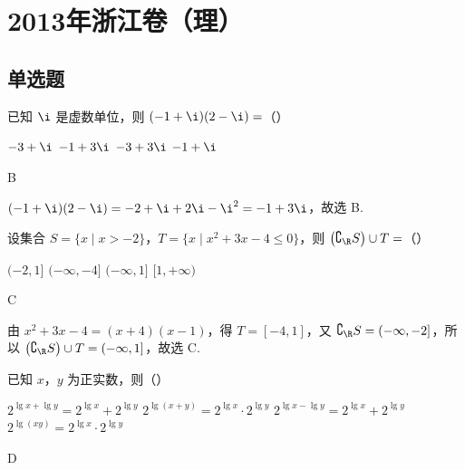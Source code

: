 \chapter{2013年浙江卷（理）}

\section{单选题}

\begin{problem}
已知 \(\i\) 是虚数单位，则 \((-1 + \i)(2 - \i) =\)（\quad）

\choices
    {\(-3 + \i\)}
    {\(-1 + 3\i\)}
    {\(-3 + 3\i\)}
    {\(-1 + \i\)}
\end{problem}

\begin{answer}
B
\end{answer}

\begin{solution}
\( (-1+\i)(2-\i)=-2+\i+2\i-\i^{2}=-1+3\i\)，故选 B.
\end{solution}

\begin{problem}
设集合 \(S = \{x \mid x > -2\}\)，\(T = \{x \mid x^2 + 3x - 4 \leqslant 0\}\)，则 \(\left(\complement_{\R} S\right) \cup T =\)（\quad）

\choices
    {\((-2, 1]\)}
    {\((-\infty, -4]\)}
    {\((-\infty, 1]\)}
    {\([1, +\infty)\)}
\end{problem}

\begin{answer}
C
\end{answer}

\begin{solution}
由 \(x^{2}+3x-4=(x+4)(x-1)\)，得 \(T=[-4,1]\)，又 \(\complement_{\R}S=(-\infty,-2]\)，所以 \(\left(\complement_{\R}S\right)\cup T=(-\infty,1]\)，故选 C.
\end{solution}

\begin{problem}
已知 \(x\)，\(y\) 为正实数，则（\quad）

\choices
    {\(2^{\lg x + \lg y} = 2^{\lg x} + 2^{\lg y}\)}
    {\(2^{\lg (x + y)} = 2^{\lg x} \cdot 2^{\lg y}\)}
    {\(2^{\lg x - \lg y} = 2^{\lg x} + 2^{\lg y}\)}
    {\(2^{\lg (xy)} = 2^{\lg x} \cdot 2^{\lg y}\)}
\end{problem}

\begin{answer}
D
\end{answer}

